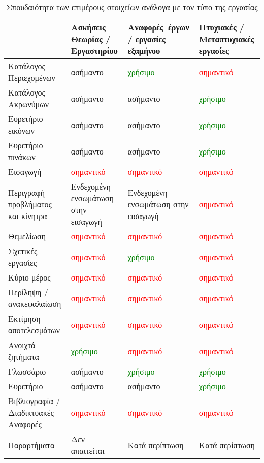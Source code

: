 \begin{table}[ht]
\centering
\begin{tabular}{ | p{2.8cm} | p{3cm} | p{3cm} | p{3cm} |}
\hline
 & Ασκήσεις Θεωρίας / Εργαστηρίου & Αναφορές έργων / εργασίες εξαμήνου & Πτυχιακές / Μεταπτυχιακές εργασίες \\ \hline
 Κατάλογος Περιεχομένων & ασήμαντο & \textcolor{green}{χρήσιμο} & \textcolor{red}{σημαντικό} \\ \hline
 Κατάλογος Ακρωνύμων & ασήμαντο & ασήμαντο & \textcolor{green}{χρήσιμο} \\ \hline
 Ευρετήριο εικόνων & ασήμαντο & ασήμαντο & \textcolor{green}{χρήσιμο} \\ \hline
 Ευρετήριο πινάκων & ασήμαντο & ασήμαντο & \textcolor{green}{χρήσιμο} \\ \hline
 Εισαγωγή & \textcolor{red}{σημαντικό} & \textcolor{red}{σημαντικό} & \textcolor{red}{σημαντικό} \\ \hline
 Περιγραφή προβλήματος και κίνητρα & Ενδεχομένη  ενσωμάτωση  στην εισαγωγή & Ενδεχομένη  ενσωμάτωση  στην εισαγωγή & \textcolor{red}{σημαντικό} \\ \hline
 Θεμελίωση & \textcolor{red}{σημαντικό} & \textcolor{red}{σημαντικό} & \textcolor{red}{σημαντικό} \\ \hline
 Σχετικές εργασίες & \textcolor{red}{σημαντικό} & \textcolor{green}{χρήσιμο} & \textcolor{red}{σημαντικό} \\ \hline
 Κύριο μέρος & \textcolor{red}{σημαντικό} & \textcolor{red}{σημαντικό} & \textcolor{red}{σημαντικό} \\ \hline
 Περίληψη / ανακεφαλαίωση & \textcolor{red}{σημαντικό} & \textcolor{red}{σημαντικό} & \textcolor{red}{σημαντικό} \\ \hline
 Εκτίμηση αποτελεσμάτων & \textcolor{red}{σημαντικό} & \textcolor{red}{σημαντικό} & \textcolor{red}{σημαντικό} \\ \hline
 Ανοιχτά ζητήματα & \textcolor{green}{χρήσιμο} & \textcolor{red}{σημαντικό} & \textcolor{red}{σημαντικό} \\ \hline
 Γλωσσάριο & ασήμαντο & \textcolor{green}{χρήσιμο} & \textcolor{green}{χρήσιμο} \\ \hline
 Ευρετήριο & ασήμαντο & ασήμαντο & \textcolor{green}{χρήσιμο} \\ \hline
 Βιβλιογραφία / Διαδικτυακές Αναφορές & \textcolor{red}{σημαντικό} & \textcolor{red}{σημαντικό} & \textcolor{red}{σημαντικό} \\ \hline
 Παραρτήματα & Δεν απαιτείται & Κατά περίπτωση & Κατά περίπτωση \\ \hline
\end{tabular}
\caption{Σπουδαιότητα των επιμέρους στοιχείων ανάλογα με τον τύπο της εργασίας}
\label{tab:importance}
\end{table}

